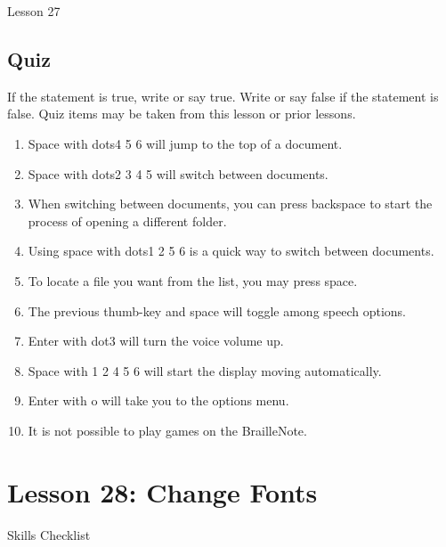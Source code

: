 \documentclass[10pt,letterpaper,twoside]{report}
\begin{document}
{{{{\newpage
Lesson 27

\subsection{Quiz}



If the statement is true, write or say true.  Write or say false if the statement is false.  Quiz items may be taken from this lesson or prior lessons.



\begin{enumerate}
	\item Space with dots4 5 6 will jump to the top of a document.
	      
	\item Space with dots2 3 4 5 will switch between documents.
	      
	\item When switching between documents, you can press backspace to start the process of opening a different folder.
	      
	\item Using space with dots1 2 5 6 is a quick way to switch between documents.
	      
	\item To locate a file you want from the list, you may press space.
	      
	\item The previous thumb-key and space will toggle among speech options.
	      
	\item Enter with dot3 will turn the voice volume up.
	      
	\item Space with 1 2 4 5 6 will start the display moving automatically.
	      
	\item Enter with o will take you to the options menu.
	      
	\item It is not possible to play games on the BrailleNote.
\end{enumerate}



\section*{Lesson 28: Change Fonts}


Skills Checklist



}}}}
\end{document}
